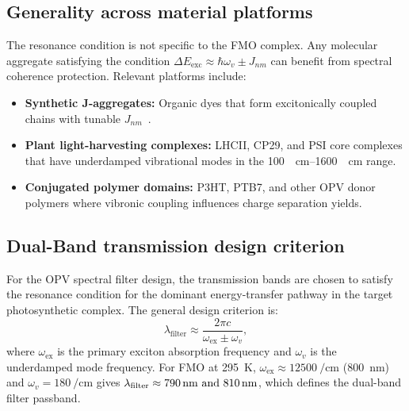 \documentclass[11pt,a4paper]{article}
\begin{document}
\subsection{Generality across material platforms}

The resonance condition is not specific to the FMO complex.
Any molecular aggregate satisfying the condition $\Delta E_{\mathrm{exc}} \approx \hbar\omega_v \pm J_{nm}$ can benefit from spectral coherence protection.
Relevant platforms include:

\begin{itemize}
\item \textbf{Synthetic J-aggregates:} Organic dyes that form excitonically coupled chains with tunable $J_{nm}$~\cite{Jang2008}.
\item \textbf{Plant light-harvesting complexes:} LHCII, CP29, and PSI core complexes that have underdamped vibrational modes in the \qtyrange{100}{1600}{\per\cm} range.
\item \textbf{Conjugated polymer domains:} P3HT, PTB7, and other OPV donor polymers where vibronic coupling influences charge separation yields.
\end{itemize}

\subsection{Dual-Band transmission design criterion}

For the OPV spectral filter design, the transmission bands are chosen to satisfy the resonance condition for the dominant energy-transfer pathway in the target photosynthetic complex.
The general design criterion is:
\begin{equation}
\lambda_{\mathrm{filter}} \approx \frac{2\pi c}{\omega_{\mathrm{ex}} \pm \omega_v},
\label{eq:SI_filter_design}
\end{equation}
where $\omega_{\mathrm{ex}}$ is the primary exciton absorption frequency and $\omega_v$ is the underdamped mode frequency.
For FMO at \qty{295}{\kelvin}, $\omega_{\mathrm{ex}} \approx \qty{12500}{\per\cm}$ (\qty{800}{\nm}) and $\omega_v = \qty{180}{\per\cm}$ gives $\lambda_{\mathrm{filter}} \approx \qtylist{790;810}{\nm}$, which defines the dual-band filter passband.

\end{document}
